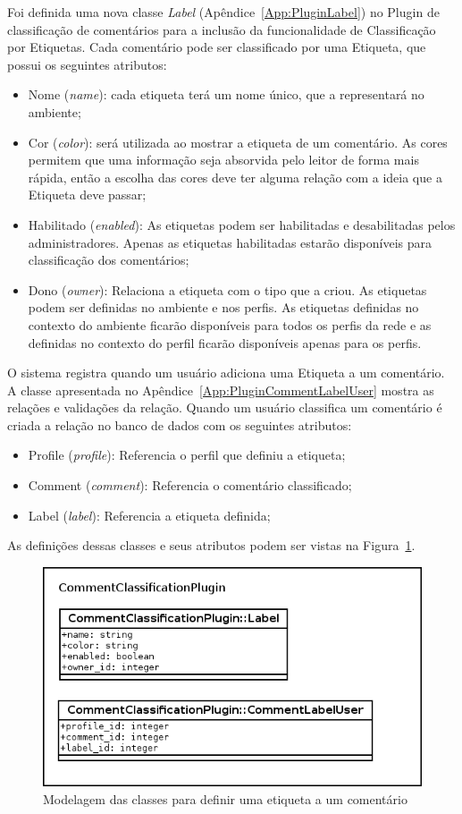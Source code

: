 \documentclass[11pt]{article}
\begin{document}
Foi definida uma nova classe {\it Label}
(Apêndice~\ref{App:PluginLabel}) no Plugin de classificação de
comentários para a inclusão da funcionalidade de Classificação por
Etiquetas. Cada comentário pode ser classificado por uma Etiqueta, que possui os
seguintes atributos:
\begin{itemize}
  \item Nome ({\it name}): cada etiqueta terá um nome único, que a representará no
ambiente;
  \item Cor ({\it color}): será utilizada ao mostrar a etiqueta de um comentário. As
cores permitem que uma informação seja absorvida pelo leitor de forma
mais rápida, então a escolha das cores deve ter alguma relação com a
ideia que a Etiqueta deve passar;
  \item Habilitado ({\it enabled}): As etiquetas podem ser habilitadas e desabilitadas
pelos administradores. Apenas as etiquetas habilitadas estarão
disponíveis para classificação dos comentários;
  \item Dono ({\it owner}): Relaciona a etiqueta com o tipo que a criou.
As etiquetas podem ser definidas no ambiente e
nos perfis. As etiquetas definidas no contexto do ambiente ficarão
disponíveis para todos os perfis da rede e as definidas no contexto do
perfil ficarão disponíveis apenas para os perfis.
\end{itemize}

O sistema registra quando um usuário adiciona uma Etiqueta a um
comentário. A classe apresentada no
Apêndice~\ref{App:PluginCommentLabelUser} mostra as relações e
validações da relação. Quando um usuário classifica um comentário é
criada a relação no banco de dados com os seguintes atributos:
\begin{itemize}
  \item Profile ({\it profile}): Referencia o perfil que definiu a
etiqueta;
  \item Comment ({\it comment}): Referencia o comentário classificado;
  \item Label ({\it label}): Referencia a etiqueta definida;
\end{itemize}

As definições dessas classes e seus atributos podem ser vistas na
Figura~\ref{fig:labels-model}.

\begin{figure}[h]
\center
\includegraphics[scale=0.5]{labels-model.png}
\caption{Modelagem das classes para definir uma etiqueta a um comentário}
\label{fig:labels-model}
\end{figure}
\end{document}
